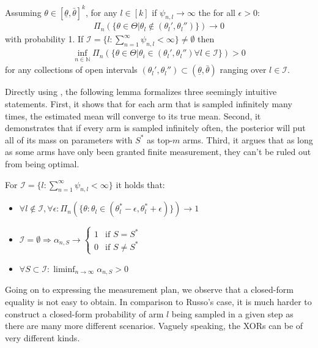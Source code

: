 \begin{proposition}\label{proposition:russo_4}
  Assuming $\theta \in [\underline{\theta}, \bar{\theta}]^k$, for any $l \in
      [k]$ if $\psi_{n, l} \rightarrow \infty$ the for all $\epsilon > 0$:
  \begin{align}
    \Pi_n(\{\theta \in \Theta | \theta_l \notin (\theta_l', \theta_l'')\})
        \rightarrow 0
  \end{align}
  with probability 1. If $\mathcal{I} = \{l: \sum_{n=1}^\infty \psi_{n, l} <
  \infty\} \neq \emptyset$ then
  \begin{align}
    \inf_{n \in \mathbb{N}} \Pi_n(\{\theta \in \Theta | \theta_i \in
        (\theta_l', \theta_l'') \forall l \in \mathcal{I}\}) > 0
  \end{align}
  for any collections of open intervals $(\theta_l', \theta_l'') \subset
  (\underline{\theta}, \bar{\theta})$ ranging over $l \in \mathcal{I}$.
\end{proposition}
Directly using , the following lemma formalizes three
seemingly intuitive statements. First, it shows that for each arm that is
sampled infinitely many times, the estimated mean will converge to its true
mean. Second, it demonstrates that if every arm is sampled infinitely often, the
posterior will put all of its mass on parameters with $S^*$ as top-$m$ arms.
Third, it argues that as long as some arms have only been granted finite
measurement, they can't be ruled out from being optimal.
\begin{lemma}\label{lemma:finite_measurement}
  For $\mathcal{I} = \{l: \sum_{n=1}^\infty \psi_{n, l} < \infty\}$ it holds
      that:
  \begin{itemize}
    \item $\forall l \notin \mathcal{I}, \forall \epsilon: \Pi_n(\{\theta:
        \theta_l \in (\theta^*_l - \epsilon, \theta^*_l + \epsilon)\})
        \rightarrow 1$
    \item $\mathcal{I} = \emptyset \Rightarrow
    \alpha_{n, S} \rightarrow \begin{cases}
      1 & \text{if } S = S^*\\
      0 & \text{if } S \neq S^*
    \end{cases}$
    \item $\forall S \subset \mathcal{I}: \liminf_{n \rightarrow \infty}
        \alpha_{n, S} > 0$
  \end{itemize}
\end{lemma}
Going on to expressing the measurement plan, we observe that a closed-form
equality is not easy to obtain. In comparison to Russo's case, it is much harder
to construct a closed-form probability of arm $l$ being sampled in a given step
as there are many more different scenarios. Vaguely speaking, the XORs can be of
very different kinds.

